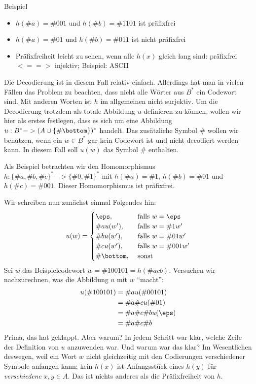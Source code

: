 \begin{tutorium}
\begin{itemize}
    Beispiel
    \begin{itemize}
    \item $h(\#a) = \#{001}$ und $h(\#b) = \#{1101}$ ist präfixfrei
    \item $h(\#a) = \#{01}$ und $h(\#b) = \#{011}$ ist nicht präfixfrei
    \item Präfixfreiheit leicht zu sehen, wenn alle $h(x)$ gleich lang
      sind: präfixfrei $<==>$ injektiv; Beispiel: ASCII
    \end{itemize}
  \end{itemize}
\end{tutorium}

Die Decodierung ist in diesem Fall relativ einfach. 
%
Allerdings hat man in vielen Fällen das Problem zu beachten, dass
nicht alle Wörter aus $B^*$ ein Codewort sind.
%
Mit anderen Worten ist $h$ im allgemeinen nicht surjektiv. 
%
Um die Decodierung trotzdem als totale Abbildung $u$ definieren zu
können, wollen wir hier als erstes festlegen, dass es sich um eine
Abbildung $u : B^* -> (A\cup\{\#{\bottom}\})^*$ handelt. 
%
Das zusätzliche Symbol \#{\bottom} wollen wir benutzen, wenn ein
$w\in B^*$ gar kein Codewort ist und nicht decodiert werden kann. 
%
In diesem Fall soll $u(w)$ das Symbol \#{\bottom} enthalten.

Als Beispiel betrachten wir den Homomorphismus $h:\{\#{a}, \#{b},
\#{c}\}^* -> \{\#0, \#1\}^*$ mit $h(\#{a})=\#{1}$, $h(\#{b})=\#{01}$
und $h(\#{c})=\#{001}$. Dieser Homomorphismus ist präfixfrei.

Wir schreiben nun zunächst einmal Folgendes hin:
\[
u(w) = 
\begin{cases}
  \eps, & \text{ falls } w=\eps\\
  \#{a}u(w'), & \text{ falls } w=\#{1}w' \\
  \#{b}u(w'), & \text{ falls } w=\#{01}w' \\
  \#{c}u(w'), & \text{ falls } w=\#{001}w' \\
  \#{\bottom},  & \text{ sonst }\\
\end{cases}
\]
%
Sei $w$ das Beispielcodewort $w=\#{100101}=h(\#{acb})$. 
%
Versuchen wir nachzurechnen, was die Abbildung $u$ mit $w$ "`macht"':
\begin{align*}
  u(\#{100101}) 
  &=\#{a} u(\#{00101}) \\
  &=\#{a} \#{c} u(\#{01}) \\
  &=\#{a} \#{c} \#{b} u(\eps) \\
  &=\#{a} \#{c} \#{b}  
\end{align*}
%
Prima, das hat geklappt. Aber warum? 
%
In jedem Schritt war klar, welche Zeile der Definition von $u$
anzuwenden war. 
%
Und warum war das klar? 
%
Im Wesentlichen deswegen, weil ein Wort $w$ nicht gleichzeitig mit den
Codierungen verschiedener Symbole anfangen kann; kein $h(x)$ ist
Anfangsstück eines $h(y)$ für \emph{verschiedene} $x,y\in A$.
%
Das ist nichts anderes als die Präfixfreiheit von $h$.

